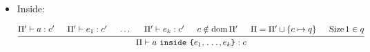 \documentclass{article}
\DeclareMathOperator{\dom}{dom}
\DeclareMathOperator{\Size}{Size}
\begin{document}
\begin{itemize}[leftmargin=*]
    \item Inside:

          \begin{equation*}
              \begin{prooftree}
                  \hypo{\Pi' \vdash a: c'}
                  \hypo{\Pi' \vdash e_1: c'}
                  \hypo{\dots}
                  \hypo{\Pi' \vdash e_k: c'}
                  \hypo{c \notin \dom \Pi'}
                  \hypo{\Pi = \Pi' \sqcup \left\{c \mapsto q\right\}}
                  \hypo{\Size 1 \in q}
                  \infer7{\Pi \vdash a~\texttt{inside}~\texttt{\{}e_1, \texttt{\dots}, e_k \texttt{\}}: c}
              \end{prooftree}
          \end{equation*}
\end{itemize}
\end{document}
